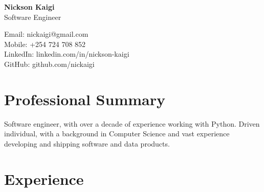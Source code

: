 \documentclass[11pt]{article} %
\begin{document}
\begin{center}
    \begin{minipage}{0.5\textwidth}
    {\Huge\bfseries
        Nickson Kaigi
        } \\ \medskip
        Software Engineer
    \end{minipage} \hfill
    \begin{minipage}{0.4\textwidth}
        \raggedleft
        Email: nickaigi@gmail.com \\
        Mobile: +254 724 708 852 \\
        LinkedIn: linkedin.com/in/nickson-kaigi \\
        GitHub: github.com/nickaigi
    \end{minipage}
\end{center}

\section{Professional Summary}
Software engineer, with over a decade of experience working with Python. Driven individual, with a background in Computer Science and vast experience developing and shipping software and data products.

\section{Experience}


\end{document}
